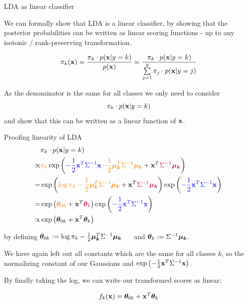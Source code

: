 \documentclass[11pt,compress,t,notes=noshow, xcolor=table]{beamer}
\begin{document}
\begin{vbframe}{LDA as linear classifier}

We can formally show that LDA is a linear classifier, by showing that the posterior probabilities
can be written as linear scoring functions - up to any isotonic / rank-preserving transformation.

$$
  \pikx = \frac{\pik \cdot \pdfxyk }{\pdfx} = \frac{\pik \cdot \pdfxyk}{\sumjg \pi_j \cdot \pdfxyk[j]}
$$

As the denominator is the same for all classes we only need to consider 
$$\pik \cdot \pdfxyk$$ 
and show that this can be written as a linear function of $\xv$.
  
\end{vbframe}

\begin{vbframe}{Proofing linearity of LDA}
\begin{eqnarray*}
& \pik \cdot \pdfxyk \\
\propto& \textcolor{orange}{\pik} \exp\left(\textcolor{blue}{- \frac{1}{2} \xv^T\Sigma^{-1}\xv} \textcolor{orange}{- \frac{1}{2} \muk^T \Sigma^{-1} \muk} + \xv^T \textcolor{purple}{\Sigma^{-1} \muk} \right) \\
=& \exp\left(\textcolor{orange}{\log \pik - \frac{1}{2} \muk^T \Sigma^{-1} \muk} + \xv^T \textcolor{purple}{\Sigma^{-1} \muk} \right) \exp\left(\textcolor{blue}{- \frac{1}{2} \xv^T\Sigma^{-1}\xv}\right) \\
=& \exp\left(\textcolor{orange}{\thetav_{0k}} + \xv^T \textcolor{purple}{\thetav_k}\right) \exp\left(\textcolor{blue}{- \frac{1}{2} \xv^T\Sigma^{-1}\xv}\right)\\
\propto& \exp\left(\thetav_{0k} + \xv^T \thetav_k\right) 
\end{eqnarray*}

by defining
$\thetav_{0k} := \log \pik  - \frac{1}{2} \muk^T \Sigma^{-1} \muk$ $\quad$ and $\thetav_k := \Sigma^{-1} \muk$.

\lz

We have again left out all constants which are the same for all classes $k$, 
  so the normalizing constant of our Gaussians and 
  $\exp\left(- \frac{1}{2} \xv^T\Sigma^{-1}\xv\right)$.

\lz

By finally taking the log, we can write our transformed scores as linear:  

$$ \fkx =  \thetav_{0k} + \xv^T \thetav_k $$

\end{vbframe}
\end{document}
